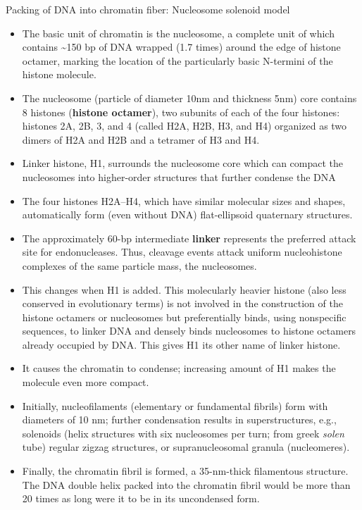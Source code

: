 \documentclass[11pt,dvipsnames,ignorenonframetext,aspectratio=169]{beamer}
\providecommand{\tightlist}{%
  \setlength{\itemsep}{0pt}\setlength{\parskip}{0pt}}
\begin{document}
\begin{frame}{Packing of DNA into chromatin fiber: Nucleosome solenoid
model}
\protect\hypertarget{packing-of-dna-into-chromatin-fiber-nucleosome-solenoid-model}{}
\small

\begin{itemize}
\tightlist
\item
  The basic unit of chromatin is the nucleosome, a complete unit of
  which contains \textasciitilde150 bp of DNA wrapped (1.7 times) around
  the edge of histone octamer, marking the location of the particularly
  basic N-termini of the histone molecule.
\item
  The nucleosome (particle of diameter 10nm and thickness 5nm) core
  contains 8 histones (\textbf{histone octamer}), two subunits of each
  of the four histones: histones 2A, 2B, 3, and 4 (called H2A, H2B, H3,
  and H4) organized as two dimers of H2A and H2B and a tetramer of H3
  and H4.
\item
  Linker histone, H1, surrounds the nucleosome core which can compact
  the nucleosomes into higher-order structures that further condense the
  DNA
\item
  The four histones H2A--H4, which have similar molecular sizes and
  shapes, automatically form (even without DNA) flat-ellipsoid
  quaternary structures.
\item
  The approximately 60-bp intermediate \textbf{linker} represents the
  preferred attack site for endonucleases. Thus, cleavage events attack
  uniform nucleohistone complexes of the same particle mass, the
  nucleosomes.
\end{itemize}
\end{frame}

\begin{frame}{}
\protect\hypertarget{section-8}{}
\small

\begin{itemize}
\tightlist
\item
  This changes when H1 is added. This molecularly heavier histone (also
  less conserved in evolutionary terms) is not involved in the
  construction of the histone octamers or nucleosomes but preferentially
  binds, using nonspecific sequences, to linker DNA and densely binds
  nucleosomes to histone octamers already occupied by DNA. This gives H1
  its other name of linker histone.
\item
  It causes the chromatin to condense; increasing amount of H1 makes the
  molecule even more compact.
\item
  Initially, nucleofilaments (elementary or fundamental fibrils) form
  with diameters of 10 nm; further condensation results in
  superstructures, e.g., solenoids (helix structures with six
  nucleosomes per turn; from greek \emph{solen} tube) regular zigzag
  structures, or supranucleosomal granula (nucleomeres).
\item
  Finally, the chromatin fibril is formed, a 35-nm-thick filamentous
  structure. The DNA double helix packed into the chromatin fibril would
  be more than 20 times as long were it to be in its uncondensed form.
\end{itemize}
\end{frame}
\end{document}
